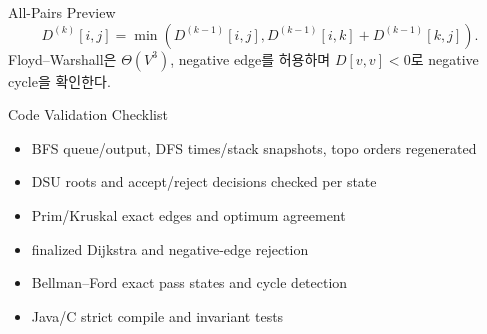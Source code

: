 \begin{frame}{All-Pairs Preview}
\[
D^{(k)}[i,j]=\min(D^{(k-1)}[i,j],D^{(k-1)}[i,k]+D^{(k-1)}[k,j]).
\]
Floyd--Warshall은 \(\Theta(V^3)\), negative edge를 허용하며 \(D[v,v]<0\)로 negative cycle을 확인한다.
\end{frame}
\begin{frame}{Code Validation Checklist}
\begin{itemize}\item BFS queue/output, DFS times/stack snapshots, topo orders regenerated\item DSU roots and accept/reject decisions checked per state\item Prim/Kruskal exact edges and optimum agreement\item finalized Dijkstra and negative-edge rejection\item Bellman--Ford exact pass states and cycle detection\item Java/C strict compile and invariant tests\end{itemize}
\end{frame}
